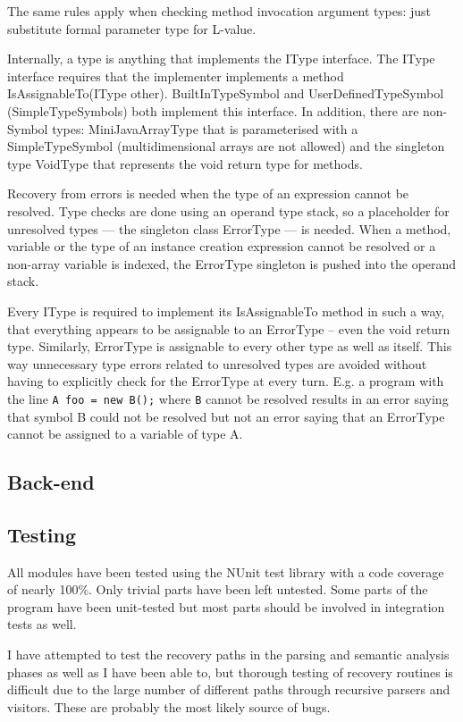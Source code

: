 \documentclass[a4paper,11pt]{article}
\begin{document}
The same rules apply when checking method invocation argument types: just substitute formal parameter type for L-value.

Internally, a type is anything that implements the IType interface. The IType interface requires that the implementer implements a method IsAssignableTo(IType other). BuiltInTypeSymbol and UserDefinedTypeSymbol (SimpleTypeSymbols) both implement this interface. In addition, there are non-Symbol types: MiniJavaArrayType that is parameterised with a SimpleTypeSymbol (multidimensional arrays are not allowed) and the singleton type VoidType that represents the void return type for methods.

Recovery from errors is needed when the type of an expression cannot be resolved. Type checks are done using an operand type stack, so a placeholder for unresolved types --- the singleton class ErrorType --- is needed. When a method, variable or the type of an instance creation expression cannot be resolved or a non-array variable is indexed, the ErrorType singleton is pushed into the operand stack.

Every IType is required to implement its IsAssignableTo method in such a way, that everything appears to be assignable to an ErrorType -- even the void return type. Similarly, ErrorType is assignable to every other type as well as itself. This way unnecessary type errors related to unresolved types are avoided without having to explicitly check for the ErrorType at every turn. E.g. a program with the line \verb,A foo = new B();, where \verb,B, cannot be resolved results in an error saying that symbol B could not be resolved but not an error saying that an ErrorType cannot be assigned to a variable of type A.

\subsection{Back-end}

\subsection{Testing}

All modules have been tested using the NUnit test library with a code coverage of nearly 100\%. Only trivial parts have been left untested. Some parts of the program have been unit-tested but most parts should be involved in integration tests as well.

I have attempted to test the recovery paths in the parsing and semantic analysis phases as well as I have been able to, but thorough testing of recovery routines is difficult due to the large number of different paths through recursive parsers and visitors. These are probably the most likely source of bugs.
\end{document}
